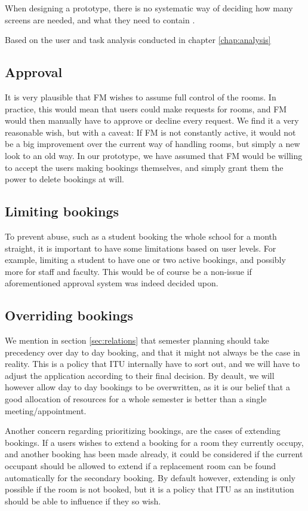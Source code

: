 When designing a prototype, there is no systematic way of deciding how many screens are needed, and what they need to contain \cite{lauesen}.


Based on the user and task analysis conducted in chapter \ref{chap:analysis}

\subsection{Approval}
\label{subsec:approval}
It is very plausible that FM wishes to assume full control of the rooms. In practice, this would mean that users could make requests for rooms, and FM would then manually have to approve or decline every request. We find it a very reasonable wish, but with a caveat: If FM is not constantly active, it would not be a big improvement over the current way of handling rooms, but simply a new look to an old way. In our prototype, we have assumed that FM would be willing to accept the users making bookings themselves, and simply grant them the power to delete bookings at will.

\subsection{Limiting bookings}
\label{subsec:limiting_bookings}
To prevent abuse, such as a student booking the whole school for a month straight, it is important to have some limitations based on user levels. For example, limiting a student to have one or two active bookings, and possibly more for staff and faculty. This would be of course be a non-issue if aforementioned approval system was indeed decided upon.

\subsection{Overriding bookings}
\label{subsec:overriding_bookings}
We mention  in section \ref{sec:relations} that semester planning should take precedency over day to day booking, and that it might not always be the case in reality. This is a policy that ITU internally have to sort out, and we will have to adjust the application according to their final decision. By deault, we will however allow day to day bookings to be overwritten, as it is our belief that a good allocation of resources for a whole semester is better than a single meeting/appointment.

Another concern regarding prioritizing bookings, are the cases of extending bookings. If a users wishes to extend a booking for a room they currently occupy, and another booking has been made already, it could be considered if the current occupant should be allowed to extend if a replacement room can be found automatically for the secondary booking. By default however, extending is only possible if the room is not booked, but it is a policy that ITU as an institution should be able to influence if they so wish.

